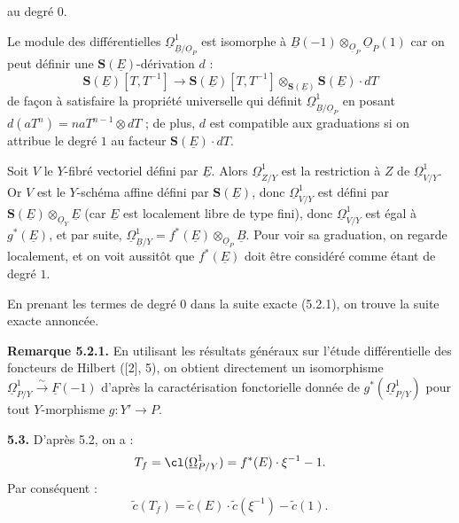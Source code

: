 
au degré \(0\).

Le module des différentielles \(\underline{\Omega}^1_{\underline{B}/\underline{O}_P}\) est isomorphe à \(\underline{B}(-1)\otimes_{\underline{O}_P}\underline{O}_P(1)\) car on peut définir une \(\mathbf{S}(\underline{E})\)-dérivation \(d\) :
\[
\mathbf{S}(\underline{E})[T,T^{-1}]
\longrightarrow
\mathbf{S}(\underline{E})[T,T^{-1}]\otimes_{\mathbf{S}(\underline{E})}\mathbf{S}(\underline{E})\cdot dT
\]
de façon à satisfaire la propriété universelle qui définit \(\underline{\Omega}^1_{\underline{B}/\underline{O}_P}\) en posant \(d(aT^n)=naT^{n-1}\otimes dT\) ; de plus, \(d\) est compatible aux graduations si on attribue le degré \(1\) au facteur \(\mathbf{S}(\underline{E})\cdot dT\).

Soit \(V\) le \(Y\)-fibré vectoriel défini par \(\underline{E}\). Alors \(\underline{\Omega}^1_{Z/Y}\) est la restriction à \(Z\) de \(\underline{\Omega}^1_{V/Y}\). Or \(V\) est le \(Y\)-schéma affine défini par \(\mathbf{S}(\underline{E})\), donc \(\underline{\Omega}^1_{V/Y}\) est défini par \(\mathbf{S}(\underline{E})\otimes_{\underline{O}_Y}\underline{E}\) (car \(\underline{E}\) est localement libre de type fini), donc \(\underline{\Omega}^1_{V/Y}\) est égal à \(g^*(\underline{E})\), et par suite, \(\underline{\Omega}^1_{\underline{B}/Y}=f^*(\underline{E})\otimes_{\underline{O}_P}\underline{B}\). Pour voir sa graduation, on regarde localement, et on voit aussitôt que \(f^*(\underline{E})\) doit être considéré comme étant de degré \(1\).

En prenant les termes de degré \(0\) dans la suite exacte (5.2.1), on trouve la suite exacte annoncée.

\textbf{Remarque 5.2.1.} En utilisant les résultats généraux sur l'étude différentielle des foncteurs de Hilbert ([2], 5), on obtient directement un isomorphisme \(\underline{\Omega}^1_{P/Y}\xrightarrow{\sim}\underline{F}(-1)\) d'après la caractérisation fonctorielle donnée de \(g^*(\underline{\Omega}^1_{P/Y})\) pour tout \(Y\)-morphisme \(g:Y'\to P\).

\textbf{5.3.} D'après 5.2, on a :
\[
 T_f=\cl(\underline{\Omega}^1_{P/Y})=f^*(E)\cdot\xi^{-1}-1.
\]
Par conséquent :
\[
 \widetilde c(T_f)=\widetilde c(E)\cdot\widetilde c(\xi^{-1})-\widetilde c(1).
\]

